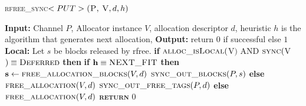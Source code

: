 \documentclass[10pt]{article}
\begin{document}
\begin{algorithm}{}
\footnotesize
\caption{\textsc{rfree\_sync}{$<PUT>\textsc{(P, V}, d, h)$}}
\label{alg:rfree_sync_put} 
\begin{algorithmic}[1]


\STATE \textbf{Input:} Channel $P$, Allocator instance $V$, allocation descriptor $d$, heuristic $h$
is the algorithm that generates next allocation, 
\STATE \textbf{Output:} return {$0$} if successful else {$1$}
\STATE \textbf{Local:} Let $s$ be blocks released by rfree.
\STATE \textbf{if} $\textsc{alloc\_isLocal}($V$)$ AND $\textsc{sync}($V$) \equiv \textsc{Deferred}$  \textbf{then} 
\STATE \quad \textbf{if} $\textbf{h} \equiv \textsc{NEXT\_FIT}$  \textbf{then}
\STATE \qquad $\textbf{s} \leftarrow  \textsc{free\_allocation\_blocks}(V, d)$ 
\STATE \qquad $\textsc{sync\_out\_blocks}(P, s)$
\STATE \quad \textbf{else}
\STATE \qquad $\textsc{free\_allocation}(V, d)$ 
\STATE \qquad $\textsc{sync\_out\_free\_tags}(P, d)$
\STATE \textbf{else}
\STATE \qquad $\textsc{free\_allocation}(V, d)$ 
\STATE \textsc{\textbf{return}} {$0$}
\STATE


\end{algorithmic}
\end{algorithm}


\end{document}
